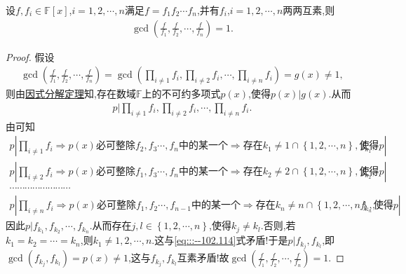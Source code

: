 \documentclass[../../main.tex]{subfiles}
\begin{document}
\begin{proposition}\label{proposition:f除以两两互素多项式得到的多项式组互素}
设$f,f_i\in \mathbb{F}[x]$,$i=1,2,\cdots,n$满足$f=f_1f_2\cdots f_n$,并有$f_i$,$i=1,2,\cdots,n$两两互素,则
\begin{align*}
\gcd\left( \frac{f}{f_1},\frac{f}{f_2},\cdots ,\frac{f}{f_n} \right) =1.
\end{align*}
\end{proposition}
\begin{proof}
假设
\begin{align*}
\gcd\left( \frac{f}{f_1},\frac{f}{f_2},\cdots ,\frac{f}{f_n} \right) =\gcd\left( \prod_{i\ne 1}{f_i},\prod_{i\ne 2}{f_i},\cdots ,\prod_{i\ne n}{f_i} \right) =g(x)\ne 1,
\end{align*}
则由\hyperref[theorem:因式分解定理]{因式分解定理}知,存在数域$\mathbb{F}$上的不可约多项式$p(x)$,使得$p(x)|g(x)$.从而
\begin{align*}
p|\prod_{i\ne 1}{f_i},\prod_{i\ne 2}{f_i},\cdots ,\prod_{i\ne n}{f_i}.
\end{align*}
由可知
\begin{gather}
p|\prod_{i\ne 1}{f_i}\Longrightarrow p\left( x \right) \text{必可整除}f_2,f_3\cdots ,f_n\text{中的某一个}\Longrightarrow \text{存在}k_1\ne 1\cap \left\{ 1,2,\cdots ,n \right\} ,\text{使得}p|f_{k_1},\label{eq:::--102.114} 
\\
p|\prod_{i\ne 2}{f_i}\Longrightarrow p\left( x \right) \text{必可整除}f_1,f_3\cdots ,f_n\text{中的某一个}\Longrightarrow \text{存在}k_2\ne 2\cap \left\{ 1,2,\cdots ,n \right\} ,\text{使得}p|f_{k_2},
\nonumber \\
\cdots \cdots \cdots \cdots \cdots \cdots \cdots \cdots 
\nonumber \\
p|\prod_{i\ne n}{f_i}\Longrightarrow p\left( x \right) \text{必可整除}f_1,f_2\cdots ,f_{n-1}\text{中的某一个}\Longrightarrow \text{存在}k_n\ne n\cap \left\{ 1,2,\cdots ,n \right\} ,\text{使得}p|f_{k_n},\nonumber
\end{gather}
因此$p|f_{k_1},f_{k_2},\cdots,f_{k_n}$.从而存在$j,l\in \left\{ 1,2,\cdots,n \right\}$,使得$k_j\ne k_l$.否则,若$k_1=k_2=\cdots=k_n$,则$k_1\ne 1,2,\cdots,n$.这与\eqref{eq:::--102.114}式矛盾!于是$p|f_{k_j},f_{k_l}$,即$\gcd(f_{k_j},f_{k_l})=p(x)\ne 1$,这与$f_{k_j},f_{k_l}$互素矛盾!故$\gcd\left( \frac{f}{f_1},\frac{f}{f_2},\cdots ,\frac{f}{f_n} \right) =1$.
\end{proof}
\end{document}

